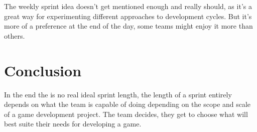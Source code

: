 \documentclass{scrartcl}
\begin{document}
The weekly sprint idea doesn't get mentioned enough and really should, as it's a great way for experimenting different approaches to development cycles. But it's more of a preference at the end of the day, some teams might enjoy it more than others.


\section{Conclusion}
\iffalse
Write your conclusion here. The conclusion should do more than summarise the essay, making clear the contribution of the work and highlighting key points, limitations, and outstanding questions. It should not introduce any new content or information.
\fi
In the end the is no real ideal sprint length, the length of a sprint entirely depends on what the team is capable of doing depending on the scope and scale of a game development project. The team decides, they get to choose what will best suite their needs for developing a game.


\end{document}

